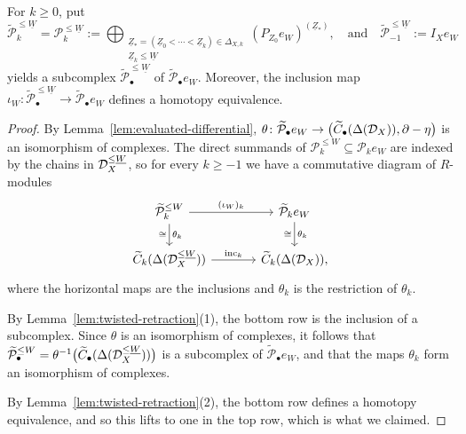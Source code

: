 \documentclass[a4paper,leqno]{amsart}
\begin{document}
\begingroup\color[rgb]{1,0,0}
\begin{prop}\label{prop:lower-deformation-retract}
For $k\geq0$, put
\[
 \widetilde{\mathcal{P}}_k^{\leq \underline{W}} = \mathcal P_k^{\leq \underline{W}}
 :=\bigoplus_{\substack{
 \underline{Z}_\ast=(\underline{Z}_0<\cdots<\underline{Z}_k)\in\Delta_{X,k}\\
 \underline{Z}_k\leq \underline{W}}}
 (P_{Z_0}e_W)^{(\underline{Z}_\ast)}, \quad \text{and}\quad  \widetilde{\mathcal{P}}_{-1}^{\leq \underline{W}}:= I_Xe_W
\]
yields a subcomplex $\widetilde{\mathcal P}_\bullet^{\leq \underline{W}}$ of $\widetilde{\mathcal P}_\bullet e_W$.  Moreover, the inclusion map $\iota_W\colon
 \widetilde{\mathcal P}_\bullet^{\leq \underline{W}}
 \rightarrow
 \widetilde{\mathcal P}_\bullet e_W$
defines a homotopy equivalence.
\end{prop}
\begin{proof}
By Lemma~\ref{lem:evaluated-differential}, $\theta\colon\widetilde{\mathcal P}_\bullet e_W\to\bigl(\widetilde C_\bullet(\Delta(\mathcal D_X)),\partial-\eta\bigr)$ is an isomorphism of complexes. The direct summands of $\mathcal P_k^{\leq W}\subseteq\mathcal P_ke_W$ are indexed by the chains in $\mathcal D_X^{\leq\underline{W}}$, so for every $k\geq-1$ we have a commutative diagram of $R$-modules
\begin{equation}
\label{eq:iota-W-transported}
\begin{tikzcd}[column sep=large]
 \widetilde{\mathcal P}_k^{\leq W} \ar[r, "(\iota_W)_k"] \ar[d, "\theta_k", "\cong"'] & \widetilde{\mathcal P}_k e_W \ar[d, "\theta_k", "\cong"'] \\
 \widetilde C_k(\Delta(\D_X^{\leq\underline{W}})) \ar[r, "\mathrm{inc}_k"] & \widetilde C_k(\Delta(\D_X)),
\end{tikzcd}
\end{equation}
where the horizontal maps are the inclusions and $\theta_k$ is the restriction of $\theta_k$. 

By Lemma~\ref{lem:twisted-retraction}\textup{(1)}, the bottom row is the inclusion of a subcomplex. Since $\theta$ is an isomorphism of complexes, it follows that $\widetilde{\mathcal P}_\bullet^{\leq W}=\theta^{-1}\bigl(\widetilde C_\bullet(\Delta(\mathcal D_X^{\leq\underline{W}}))\bigr)$ is a subcomplex of $\widetilde{\mathcal P}_\bullet e_W$, and that the maps $\theta_k$ form an isomorphism of complexes. 

By Lemma~\ref{lem:twisted-retraction}\textup{(2)}, the bottom row defines a homotopy equivalence, and so this lifts to one in the top row, which is what we claimed.
\end{proof}
\end{document}
